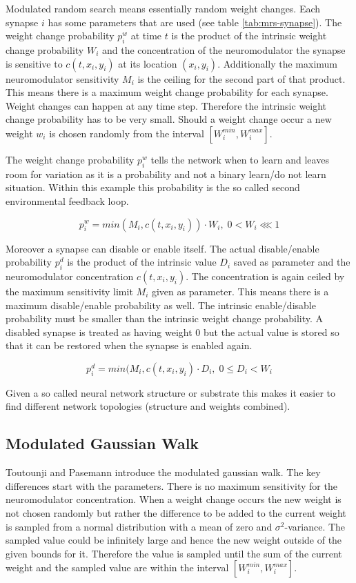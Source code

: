 \documentclass[12pt,twoside]{scrartcl}
\theoremstyle{plain}
\theoremstyle{definition}
\theoremstyle{remark}
\begin{document}
Modulated random search means essentially random weight changes. Each synapse \(i\)
has some parameters that are used (see table \ref{tab:mrs-synapse}). The weight
change probability \(p_i^w\) at time \(t\) is the product of the intrinsic weight
change probability \(W_i\) and the concentration of the neuromodulator the synapse
is sensitive to \(c(t, x_i, y_i)\) at its location \((x_i, y_i)\). Additionally
the maximum neuromodulator sensitivity \(M_i\) is the ceiling for the second part
of that product. This means there is a maximum weight change probability for each
synapse. Weight changes can happen at any time step. Therefore the intrinsic weight
change probability has to be very small. Should a weight change occur a new weight
\(w_i\) is chosen randomly from the interval \([W_i^{min}, W_i^{max}]\).

The weight change probability \(p_i^w\) tells the network when to learn and leaves
room for variation as it is a probability and not a binary learn/do not learn
situation. Within this example this probability is the so called second environmental
feedback loop.


\[
    p_i^w = min(M_i, c(t, x_i, y_i)) \cdot W_i,\; 0 < W_i \lll 1
\]

Moreover a synapse can disable or enable itself. The actual disable/enable
probability \(p_i^d\) is the product of the intrinsic value \(D_i\) saved as
parameter and the neuromodulator concentration \(c(t, x_i, y_i)\). The concentration
is again ceiled by the maximum sensitivity limit \(M_i\) given as parameter.
This means there is a maximum disable/enable probability as well. The intrinsic
enable/disable probability must be smaller than the intrinsic weight change probability.
A disabled synapse is treated as having weight 0 but the actual value is stored
so that it can be restored when the synapse is enabled again.

\[
    p_i^d = min(M_i, c(t, x_i, y_i) \cdot D_i,\; 0 \leq D_i < W_i
\]

Given a so called neural network structure or substrate this makes it easier
to find different network topologies (structure and weights combined).

\subsection{Modulated Gaussian Walk}
\label{subsec:mgw}

Toutounji and Pasemann introduce the modulated gaussian walk. The key differences
start with the parameters. There is no maximum sensitivity for the neuromodulator
concentration. When a weight change occurs the new weight is not chosen randomly
but rather the difference to be added to the current weight is sampled from a
normal distribution with a mean of zero and \(\sigma^2\)-variance. The sampled
value could be infinitely large and hence the new weight outside of the given
bounds for it. Therefore the value is sampled until the sum of the
current weight and the sampled value are within the interval \([W_i^{min}, W_i^{max}]\).
\end{document}
